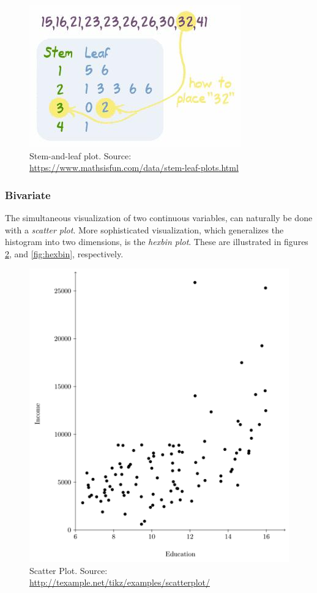 \documentclass[12pt,a4paper]{report}
\begin{document}
\begin{figure}
\centering
\includegraphics[width=0.7\linewidth]{art/stem_and_leaf}
\caption[Stem and Leaf Pot]{Stem-and-leaf plot. Source: \url{https://www.mathsisfun.com/data/stem-leaf-plots.html}}
\label{fig:stem_and_leaf}
\end{figure}




\subsubsection{Bivariate}
The simultaneous visualization of two continuous variables, can naturally be done with a \emph{scatter plot}.
More sophisticated visualization, which generalizes the histogram into two dimensions, is the \emph{hexbin plot}.  
These are illustrated in figures \ref{fig:scatterplot}, and \ref{fig:hexbin}, respectively. 

\begin{figure}
\centering
\includegraphics[width=0.7\linewidth]{art/scatterplot}
\caption[Scatter Plot]{Scatter Plot. Source: \url{http://texample.net/tikz/examples/scatterplot/}}
\label{fig:scatterplot}
\end{figure}
\end{document}
